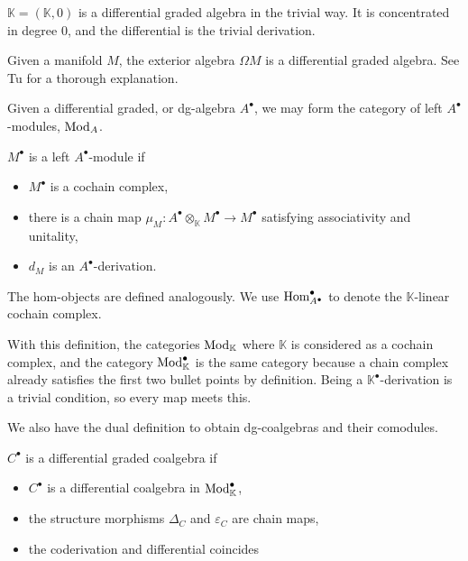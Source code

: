 \documentclass[../thesis.tex]{subfiles}
\begin{document}
            \begin{example}
                $\mathbb{K} = (\mathbb{K},0)$ is a differential graded algebra in the trivial way. It is concentrated in degree $0$, and the differential is the trivial derivation.
            \end{example}
            \begin{example}
                Given a manifold $M$, the exterior algebra $\Omega M$ is a differential graded algebra. See Tu \cite{Tu07} for a thorough explanation.
            \end{example}

            Given a differential graded, or dg-algebra $A^\bullet$, we may form the category of left $A^\bullet$-modules, $\tt{Mod}_A$.
            \begin{definition}
                $M^\bullet$ is a left $A^\bullet$-module if
                \begin{itemize}
                    \item $M^\bullet$ is a cochain complex,
                    \item there is a chain map $\mu_M : A^\bullet\otimes_\mathbb{K} M^\bullet \rightarrow M^\bullet$ satisfying associativity and unitality,
                    \item $d_M$ is an $A^\bullet$-derivation.
                \end{itemize}
            \end{definition}
            The hom-objects are defined analogously. We use $\tt{Hom}_{A^\bullet}^\bullet$ to denote the $\mathbb{K}$-linear cochain complex.

            With this definition, the categories $\tt{Mod}_\mathbb{K}$ where $\mathbb{K}$ is considered as a cochain complex, and the category $\tt{Mod}_\mathbb{K}^\bullet$ is the same category because a chain complex already satisfies the first two bullet points by definition. Being a $\mathbb{K}^\bullet$-derivation is a trivial condition, so every map meets this.

            We also have the dual definition to obtain dg-coalgebras and their comodules.
            
            \begin{definition}
                $C^{\bullet}$ is a differential graded coalgebra if
                \begin{itemize}
                    \item $C^\bullet$ is a differential coalgebra in $\tt{Mod}_\mathbb{K}^\bullet$,
                    \item the structure morphisms $\Delta_C$ and $\varepsilon_C$ are chain maps,
                    \item the coderivation and differential coincides
                \end{itemize}
            \end{definition}
\end{document}
